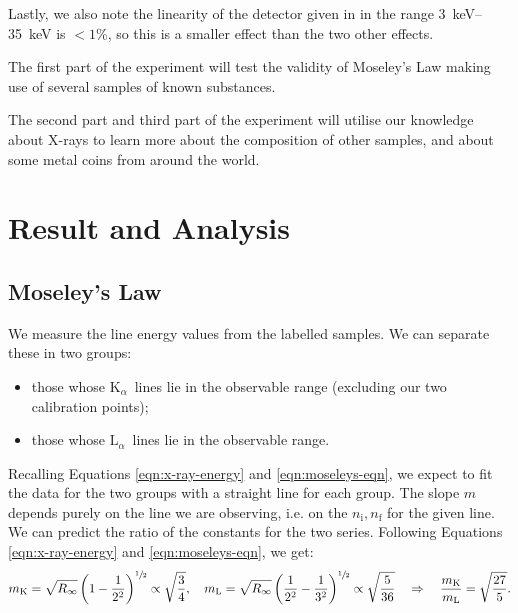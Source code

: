 \documentclass[11pt,a4paper,twoside,onecolumn]{article}
\newcommand{\rydberg}{R}
\newcommand{\Kalpha}{$\mathrm{K}_\alpha$~}
\newcommand{\Lalpha}{$\mathrm{L}_\alpha$~}
\begin{document}
Lastly, we also note the linearity of the detector given in \cite[Section 5]{xRayManual} in the range \qtyrange{3}{35}{keV} is $ < 1\%$, so this is a smaller effect than the two other effects.

The first part of the experiment will test the validity of Moseley's Law making use of several samples of known substances.

The second part and third part of the experiment will utilise our knowledge about X-rays to learn more about the composition of other samples, and about some metal coins from around the world.

\section{Result and Analysis}

\subsection{Moseley's Law}
We measure the line energy values from the labelled samples. We can separate these in two groups:
\begin{itemize}[noitemsep]
    \item those whose \Kalpha lines lie in the observable range (excluding our two calibration points);
    \item those whose \Lalpha lines lie in the observable range.
\end{itemize}
Recalling Equations \eqref{eqn:x-ray-energy} and \eqref{eqn:moseleys-eqn}, we expect to fit the data for the two groups with a straight line for each group. The slope $m$ depends purely on the line we are observing, i.e. on the $n_\mathrm{i}, n_\mathrm{f}$ for the given line. We can predict the ratio of the constants for the two series. Following Equations \eqref{eqn:x-ray-energy} and \eqref{eqn:moseleys-eqn}, we get:
\begin{equation}
    m_\mathrm{K} = \sqrt{\rydberg_\infty} \left(1 - \frac{1}{2^2}\right)^{\sfrac{1}{2}} \propto \sqrt{\frac{3}{4}},\quad m_\mathrm{L} = \sqrt{\rydberg_\infty} \left(\frac{1}{2^2} - \frac{1}{3^2}\right)^{\sfrac{1}{2}} \propto \sqrt{\frac{5}{36}} \quad \Rightarrow \quad \frac{m_\mathrm{K}}{m_\mathrm{L}} = \sqrt{\frac{27}{5}}.
\end{equation}
\end{document}
